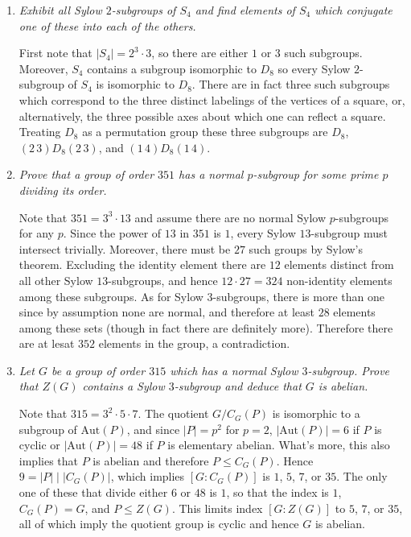 \documentclass[letterpaper, 11pt]{article}
\newcommand{\Aut}{\text{Aut}}
\begin{document}
\begin{enumerate}
\item \emph{Exhibit all Sylow $2$-subgroups of $S_4$ and find elements of $S_4$ which conjugate one of these into each of the others.}

First note that $|S_4| = 2^3 \cdot 3$, so there are either $1$ or $3$ such subgroups.  Moreover, $S_4$ contains a subgroup isomorphic to $D_8$ so every Sylow $2$-subgroup of $S_4$ is isomorphic to $D_8$.  There are in fact three such subgroups which correspond to the three distinct labelings of the vertices of a square, or, alternatively, the three possible axes about which one can reflect a square.  Treating $D_8$ as a permutation group these three subgroups are $D_8$, $(2\,3)D_8(2\,3)$, and $(1\,4)D_8(1\,4)$.

\item \emph{Prove that a group of order $351$ has a normal $p$-subgroup for some prime $p$ dividing its order.}

Note that $351 = 3^3 \cdot 13$ and assume there are no normal Sylow $p$-subgroups for any $p$.  Since the power of $13$ in $351$ is $1$, every Sylow $13$-subgroup must intersect trivially.  Moreover, there must be $27$ such groups by Sylow's theorem.  Excluding the identity element there are $12$ elements distinct from all other Sylow $13$-subgroups, and hence $12 \cdot 27 = 324$ non-identity elements among these subgroups.  As for Sylow $3$-subgroups, there is more than one since by assumption none are normal, and therefore at least $28$ elements among these sets (though in fact there are definitely more).  Therefore there are at lesat $352$ elements in the group, a contradiction.

\item \emph{Let $G$ be a group of order $315$ which has a normal Sylow $3$-subgroup.  Prove that $Z(G)$ contains a Sylow $3$-subgroup and deduce that $G$ is abelian.}

Note that $315 = 3^2 \cdot 5 \cdot 7$.  The quotient $G/C_G(P)$ is isomorphic to a subgroup of $\Aut(P)$, and since $|P| = p^2$ for $p=2$, $|\Aut(P)| = 6$ if $P$ is cyclic or $|\Aut(P)| = 48$ if $P$ is elementary abelian.  What's more, this also implies that $P$ is abelian and therefore $P \leq C_G(P)$.  Hence $9 = |P| \mid \left|C_G(P)\right|$, which implies $[G:C_G(P)]$ is $1$, $5$, $7$, or $35$.  The only one of these that divide either $6$ or $48$ is $1$, so that the index is $1$, $C_G(P) = G$, and $P \leq Z(G)$.  This limits index $[G:Z(G)]$ to $5$, $7$, or $35$, all of which imply the quotient group is cyclic and hence $G$ is abelian.


\end{enumerate}
\end{document}
